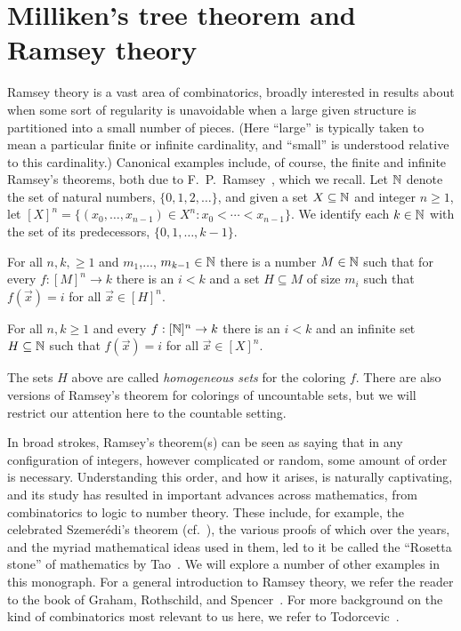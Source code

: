 \section{Milliken's tree theorem and Ramsey theory}

Ramsey theory is a vast area of combinatorics, broadly interested in results about when some sort of regularity is unavoidable when a large given structure is partitioned into a small number of pieces. (Here ``large'' is typically taken to mean a particular finite or infinite cardinality, and ``small'' is understood relative to this cardinality.) Canonical examples include, of course, the finite and infinite Ramsey's theorems, both due to F.~P.~Ramsey~\cite{Ramsey1929}, which we recall. Let $\mathbb{N}$ denote the set of natural numbers, $\{0,1,2,\ldots\}$, and given a set $X \subseteq \mathbb{N}$ and integer $n \geq 1$, let $[X]^n = \{ ( x_0,\ldots,x_{n-1} ) \in X^n: x_0 < \cdots < x_{n-1}\}$. We identify each $k \in \mathbb{N}$ with the set of its predecessors, $\{0,1,\ldots,k-1\}$.

\begin{theorem}
	For all $n,k, \geq 1$ and $m_1$,$\ldots$, $m_{k-1} \in \mathbb{N}$ there is a number $M \in \mathbb{N}$ such that for every $f: [M]^n \to k$ there is an $i < k$ and a set $H \subseteq M$ of size $m_i$ such that $f(\vec{x}) = i$ for all $\vec{x} \in [H]^n$.
\end{theorem}

\begin{theorem}
	For all $n,k \geq 1$ and every $f: [\mathbb{N}]^n \to k$ there is an $i < k$ and an infinite set $H \subseteq \mathbb{N}$ such that $f(\vec{x}) = i$ for all $\vec{x} \in [X]^n$.
\end{theorem}

\noindent The sets $H$ above are called \emph{homogeneous sets} for the coloring $f$. There are also versions of Ramsey's theorem for colorings of uncountable sets, but we will restrict our attention here to the countable setting.

In broad strokes, Ramsey's theorem(s) can be seen as saying that in any configuration of integers, however complicated or random, some amount of order is necessary. Understanding this order, and how it arises, is naturally captivating, and its study has resulted in important advances across mathematics, from combinatorics to logic to number theory. These include, for example, the celebrated Szemer\'{e}di's theorem (cf.~\cite{Szemeredi1975,Szemeredi1975b}), the various proofs of which over the years, and the myriad mathematical ideas used in them, led to it be called the ``Rosetta stone'' of mathematics by Tao~\cite{Tao2007}. We will explore a number of other examples in this monograph. For a general introduction to Ramsey theory, we refer the reader to the book of Graham, Rothschild, and Spencer~\cite{GRS2013}. For more background on the kind of combinatorics most relevant to us here, we refer to Todorcevic~\cite{Todorcevic2010Ramsey}.

